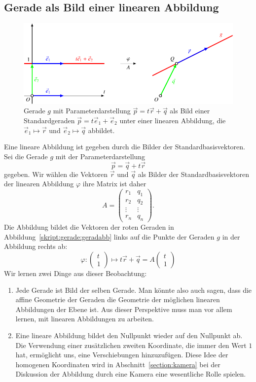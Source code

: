 \subsection{Gerade als Bild einer linearen Abbildung}
\begin{figure}
\centering
\includegraphics{3/images/geradeabb.pdf}
\caption{Gerade $g$ mit Parameterdarstellung $\vec{p} = t\vec{r}+\vec{q}$
als Bild einer Standardgeraden $\vec{p}=t\vec{e}_1+\vec{e}_2$ unter
einer linearen Abbildung, die $\vec{e}_1\mapsto\vec{r}$
und $\vec{e}_2\mapsto\vec{q}$ abbildet.
\label{skript:gerade:geradabb}}
\end{figure}
Eine lineare Abbildung ist gegeben durch die Bilder der
Standardbasisvektoren.
Sei die Gerade $g$ mit der Parameterdarstellung
\[
\vec{p}
=
\vec{q} + t\vec{r}
\]
gegeben.
Wir wählen die Vektoren $\vec{r}$ und $\vec{q}$ als Bilder der
Standardbasisvektoren der linearen Abbildung $\varphi$ ihre Matrix ist
daher 
\[
A=
\begin{pmatrix}
r_1   &q_1   \\
r_2   &q_2   \\
\vdots&\vdots\\
r_n   &q_n   
\end{pmatrix}.
\]
Die Abbildung bildet die Vektoren der roten Geraden in
Abbildung~\eqref{skript:gerade:geradabb} links auf die Punkte der
Geraden $g$ in der Abbildung rechts ab:
\[
\varphi
:
\begin{pmatrix}
t\\1
\end{pmatrix}
\mapsto
t\vec{r}
+
\vec{q}
=
A
\begin{pmatrix}
t\\1
\end{pmatrix}
\]
Wir lernen zwei Dinge aus dieser Beobachtung:
\begin{enumerate}
\item
Jede Gerade ist Bild der selben Gerade.
Man könnte also auch sagen, dass die affine Geometrie der Geraden
die Geometrie der möglichen linearen Abbildungen der Ebene ist.
Aus dieser Perspektive muss man vor allem lernen, mit linearen
Abbildungen zu arbeiten.
\item
Eine lineare Abbildung bildet den Nullpunkt wieder auf den Nullpunkt ab.
Die Verwendung einer zusätzlichen zweiten Koordinate, die immer den
Wert $1$ hat, ermöglicht uns, eine Verschiebungen hinzuzufügen.
Diese Idee der homogenen Koordinaten wird in Abschnitt~\ref{section:kamera}
bei der Diskussion der Abbildung durch eine Kamera eine wesentliche Rolle
spielen.
\end{enumerate}


